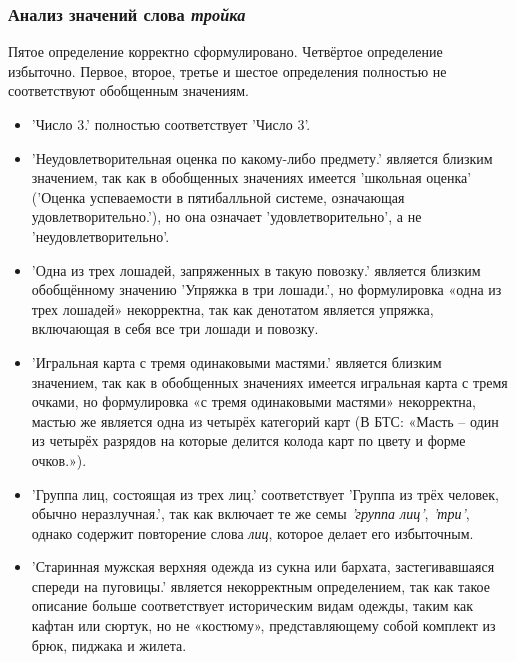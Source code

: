\documentclass[LI,VKR]{HSEUniversity}
\begin{document}
\subsubsection*{Анализ значений слова \textit{тройка}}

Пятое определение корректно сформулировано.
Четвёртое определение избыточно.
Первое, второе, третье и шестое определения полностью не соответствуют обобщенным значениям.

\begin{itemize}
    \item ’Число 3.’ полностью соответствует ’Число 3’.
\end{itemize}

\begin{itemize}
    \item ’Неудовлетворительная оценка по какому-либо предмету.’ является близким значением,
так как в обобщенных значениях имеется ’школьная оценка’
(’Оценка успеваемости в пятибалльной системе, означающая удовлетворительно.’),
но она означает ’удовлетворительно’, а не ’неудовлетворительно’.

    \item ’Одна из трех лошадей, запряженных в такую повозку.’ является близким обобщённому
значению ’Упряжка в три лошади.’,
но формулировка «одна из трех лошадей» некорректна,
так как денотатом является упряжка, включающая в себя все три лошади и повозку.

    \item ’Игральная карта с тремя одинаковыми мастями.’ является близким значением,
так как в обобщенных значениях имеется игральная карта с тремя очками,
но формулировка «с тремя одинаковыми мастями» некорректна,
мастью же является одна из четырёх категорий карт (В БТС:
«Масть – один из четырёх разрядов на которые делится колода карт по цвету и форме очков.»).

    \item ’Группа лиц, состоящая из трех лиц.’ соответствует
’Группа из трёх человек, обычно неразлучная.’, так как включает те же семы \textit{’группа лиц’}, \textit{’три’},
однако содержит повторение слова \textit{лиц}, которое делает его избыточным.

    \item ’Старинная мужская верхняя одежда из сукна или бархата, застегивавшаяся спереди на пуговицы.’
является некорректным определением, так как такое описание больше соответствует
историческим видам одежды, таким как кафтан или сюртук, но не «костюму»,
представляющему собой комплект из брюк, пиджака и жилета.
\end{itemize}
\end{document}
